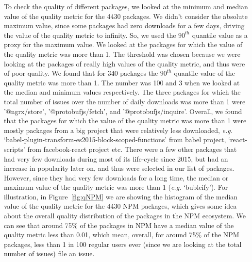 \documentclass[smallextended]{svjour3}       %
\begin{document}
To check the quality of different packages, we looked at the minimum and median value of the quality metric for the 4430 packages. We didn't consider the absolute maximum value, since some packages had zero downloads for a few days, driving the value of the quality metric to infinity. So, we used the $90^{th}$ quantile value as a proxy for the maximum value. We looked at the packages for which the value of the quality metric was more than 1. The threshold was chosen because we were looking at the packages of really high values of the quality metric, and thus were of poor quality. We found that for 340 packages the $90^{th}$ quantile value of the quality metric was more than 1. The number was 100 and 3 when we looked at the median and minimum values respectively. The three packages for which the total number of issues over the number of daily downloads was more than 1 were '@ngrx/store', '@protobufjs/fetch', and '@protobufjs/inquire'. Overall, we found that the packages for which the value of the quality metric was more than 1 were mostly packages from a big project that were relatively less downloaded, \emph{e.g.} `babel-plugin-transform-es2015-block-scoped-functions' from babel project, `react-scripts' from facebook-react project etc. There were a few other packages that had very few downloads during most of its life-cycle since 2015, but had an increase in popularity later on, and thus were selected in our list of packages. However, since they had very few downloads for a long time, the median or maximum value of the quality metric was more than 1 (\emph{e.g.} `bubleify'). 
For illustration, in Figure~\ref{fig:qNPM} we are showing the histogram of the median value of the quality metric for the 4430 NPM packages, which gives some idea about the overall quality distribution of the packages in the NPM ecosystem. We can see that around 75\% of the packages in NPM have a median value of the quality metric less than 0.01, which mean, overall, for around 75\% of the NPM packages, less than 1 in 100 regular users ever (since we are looking at the total number of issues) file an issue.
\end{document}
